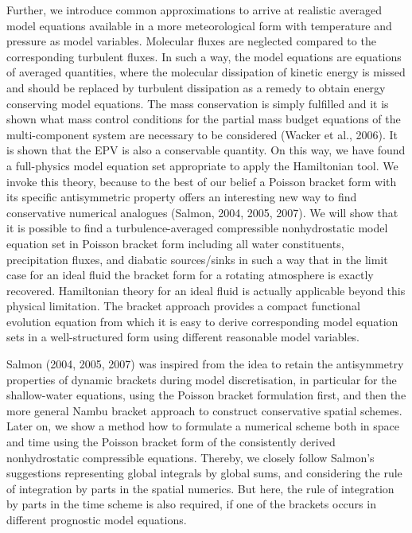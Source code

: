Further, we introduce common approximations to arrive at realistic averaged model equations available in a more meteorological form with temperature and pressure as model variables. Molecular fluxes are neglected compared to the corresponding turbulent fluxes. In such a way, the model equations are equations of averaged quantities, where the molecular dissipation of kinetic energy is missed and should be replaced by turbulent dissipation as a remedy to obtain energy conserving model equations. The mass conservation is simply fulfilled and it is shown what mass control conditions for the partial mass budget equations of the multi-component system are necessary to be considered (Wacker et al., 2006). It is shown that the EPV is also a conservable quantity.
On this way, we have found a full-physics model equation set appropriate to apply the Hamiltonian tool. 
We invoke this theory, because to the best of our belief a Poisson bracket form with its specific antisymmetric property offers an interesting new way to find conservative numerical analogues (Salmon, 2004, 2005, 2007). We will show that it is possible to find a turbulence-averaged compressible nonhydrostatic model equation set in Poisson bracket form including all water constituents, precipitation fluxes, and diabatic sources/sinks in such a way that in the limit case for an ideal fluid the bracket form for a rotating atmosphere is exactly recovered. Hamiltonian theory for an ideal fluid is actually  applicable beyond this physical limitation. The bracket approach provides a compact functional evolution equation from which it is easy to derive corresponding model equation sets in a well-structured form using different reasonable model variables.

Salmon (2004, 2005, 2007) was inspired from the idea to retain the antisymmetry properties of dynamic brackets during model discretisation, in particular for the shallow-water equations, using the Poisson bracket formulation first, and then the more general Nambu bracket approach to construct conservative spatial schemes. Later on, we show a method how to formulate a numerical scheme both in space and time using the Poisson bracket form of the consistently derived nonhydrostatic compressible equations. Thereby, we closely follow Salmon's suggestions representing global integrals by global sums, and considering the rule of integration by parts in the spatial numerics. But here, the rule of integration by parts in the time scheme is also required, if one of the brackets occurs in different prognostic model equations.

